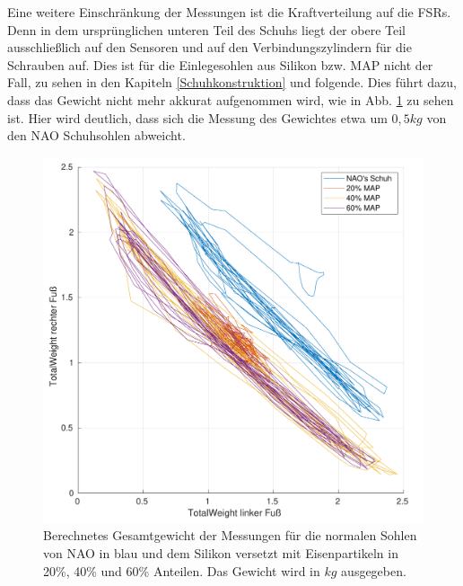 Eine weitere Einschränkung der Messungen ist die Kraftverteilung auf die FSRs. Denn in dem ursprünglichen unteren Teil des Schuhs liegt der obere Teil ausschließlich auf den Sensoren und auf den Verbindungszylindern für die Schrauben auf. Dies ist für die Einlegesohlen aus Silikon bzw. MAP nicht der Fall, zu sehen in den Kapiteln \ref{Schuhkonstruktion} und folgende. Dies führt dazu, dass das Gewicht nicht mehr akkurat aufgenommen wird, wie in Abb. \ref{total_weight} zu sehen ist. Hier wird deutlich, dass sich die Messung des Gewichtes etwa um $0,5 \unit{kg}$ von den NAO Schuhsohlen abweicht. 
\begin{figure}[tb]
	\centering
	\includegraphics[width=0.9\linewidth]{Bilder/TotalWeight_Grund_20_40_60_mean.pdf}
	\caption{Berechnetes Gesamtgewicht der Messungen für die normalen Sohlen von NAO in blau und dem Silikon versetzt mit Eisenpartikeln in 20\%, 40\% und 60\% Anteilen. Das Gewicht wird in $\unit{kg}$ ausgegeben.}
	\label{total_weight}
\end{figure}

